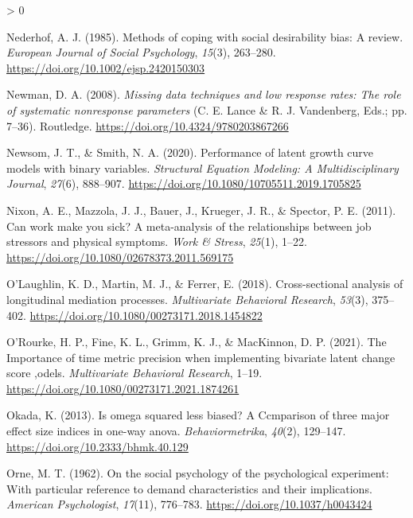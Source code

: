 \documentclass[
12pt, %
twoside,
english]{guelphthesis}
\newlength{\cslhangindent}
\newenvironment{CSLReferences}[2] %
 {%
  \setlength{\parindent}{0pt}
  \ifodd #1 \everypar{\setlength{\hangindent}{\cslhangindent}}\ignorespaces\fi
  \ifnum #2 > 0
  \setlength{\parskip}{\linespacing{2}}
  \fi
 }%
 {}
\theoremstyle{definition}
\theoremstyle{definition}
\theoremstyle{definition}
\theoremstyle{definition}
\theoremstyle{remark}
\begin{document}
\begin{CSLReferences}{1}{0}
\leavevmode{}%
Nederhof, A. J. (1985). Methods of coping with social desirability bias: A review. \emph{European Journal of Social Psychology}, \emph{15}(3), 263--280. \url{https://doi.org/10.1002/ejsp.2420150303}

\leavevmode{}%
Newman, D. A. (2008). \emph{Missing data techniques and low response rates: The role of systematic nonresponse parameters} (C. E. Lance \& R. J. Vandenberg, Eds.; pp. 7--36). Routledge. \url{https://doi.org/10.4324/9780203867266}

\leavevmode{}%
Newsom, J. T., \& Smith, N. A. (2020). Performance of latent growth curve models with binary variables. \emph{Structural Equation Modeling: A Multidisciplinary Journal}, \emph{27}(6), 888--907. \url{https://doi.org/10.1080/10705511.2019.1705825}

\leavevmode{}%
Nixon, A. E., Mazzola, J. J., Bauer, J., Krueger, J. R., \& Spector, P. E. (2011). Can work make you sick? A meta-analysis of the relationships between job stressors and physical symptoms. \emph{Work \& Stress}, \emph{25}(1), 1--22. \url{https://doi.org/10.1080/02678373.2011.569175}

\leavevmode{}%
O'Laughlin, K. D., Martin, M. J., \& Ferrer, E. (2018). Cross-sectional analysis of longitudinal mediation processes. \emph{Multivariate Behavioral Research}, \emph{53}(3), 375--402. \url{https://doi.org/10.1080/00273171.2018.1454822}

\leavevmode{}%
O'Rourke, H. P., Fine, K. L., Grimm, K. J., \& MacKinnon, D. P. (2021). The Importance of time metric precision when implementing bivariate latent change score ,odels. \emph{Multivariate Behavioral Research}, 1--19. \url{https://doi.org/10.1080/00273171.2021.1874261}

\leavevmode{}%
Okada, K. (2013). Is omega squared less biased? A Ccmparison of three major effect size indices in one-way anova. \emph{Behaviormetrika}, \emph{40}(2), 129--147. \url{https://doi.org/10.2333/bhmk.40.129}

\leavevmode{}%
Orne, M. T. (1962). On the social psychology of the psychological experiment: With particular reference to demand characteristics and their implications. \emph{American Psychologist}, \emph{17}(11), 776--783. \url{https://doi.org/10.1037/h0043424}


\end{CSLReferences}
\end{document}
